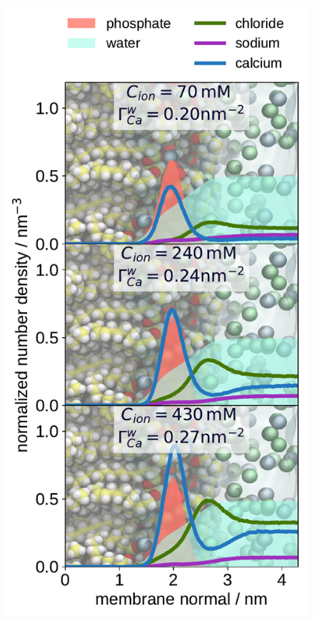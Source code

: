 \documentclass[journal=jpcbfk,manuscript=article]{achemso}
\newlength{\figwidth}
\begin{document}
\begin{figure}[htbp!] 
  \centering 
  \includegraphics[width=\figwidth]{../img/ecc_pops/density_profiles_ca_na_cl_wat_phos_models-compar_1-3_CaCl2-series.pdf}
  \caption{\label{fig:cacl-dens_PCPS} 
}
\end{figure}
\end{document}
